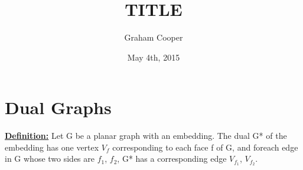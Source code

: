\documentclass[12pt]{article}
\title{\vspace{-15ex}TITLE\vspace{-1ex}}
\date{May 4th, 2015}
\author{Graham Cooper}
\newcommand{\myt}[1]{\textbf{\underline{#1}}}
\begin{document}
	\maketitle
	
	\section*{Dual Graphs}
	\myt{Definition:} Let G be a planar graph with an embedding. The dual G* of the embedding has one vertex $V_f$ corresponding to each face f of G, and foreach edge in G whose two sides are $f_1$, $f_2$, G* has a corresponding edge $V_f_1$, $V_f_2$.\\
	
\end{document}
